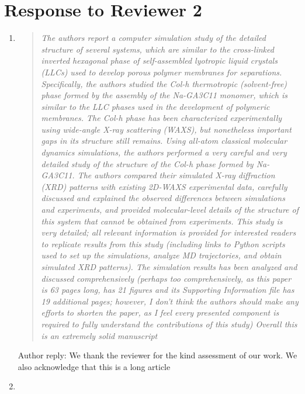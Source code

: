 \documentclass{article}
\begin{document}
\section{Response to Reviewer 2}

\begin{enumerate}
	
	\item \begin{quote} \textit{The authors report a computer simulation study of the detailed structure
	of several systems, which are similar to the cross-linked inverted hexagonal phase of self-assembled
	lyotropic liquid crystals (LLCs) used to develop porous polymer membranes for separations. Specifically,
	the authors studied the Col-h thermotropic (solvent-free) phase formed by the assembly of the Na-GA3C11
	monomer, which is similar to the LLC phases used in the development of polymeric membranes. The Col-h 
	phase has been characterized experimentally using wide-angle X-ray scattering (WAXS), but nonetheless 
	important gaps in its structure still remains. Using all-atom classical molecular dynamics simulations,
	the authors performed a very careful and very detailed study of the structure of the Col-h phase formed
	by Na-GA3C11. The authors compared their simulated X-ray diffraction (XRD) patterns with existing 2D-WAXS
	experimental data, carefully discussed and explained the observed differences between simulations and 
	experiments, and provided molecular-level details of the structure of this system that cannot be obtained
	from experiments. This study is very detailed; all relevant information is provided for interested readers
	to replicate results from this study (including links to Python scripts used to set up the simulations, 
	analyze MD trajectories, and obtain simulated XRD patterns). The simulation results has been analyzed and
	discussed comprehensively (perhaps too comprehensively, as this paper is 63 pages long, has 21 figures and
	its Supporting Information file has 19 additional pages; however, I don’t think the authors should make any
	efforts to shorten the paper, as I feel every presented component is required to fully understand the 
	contributions of this study) Overall this is an extremely solid manuscript}\end{quote}
	
	Author reply: We thank the reviewer for the kind assessment of our work. We also acknowledge that this is a long article
	
	\item \begin{quote}
	

\end{quote}
\end{enumerate}
\end{document}
